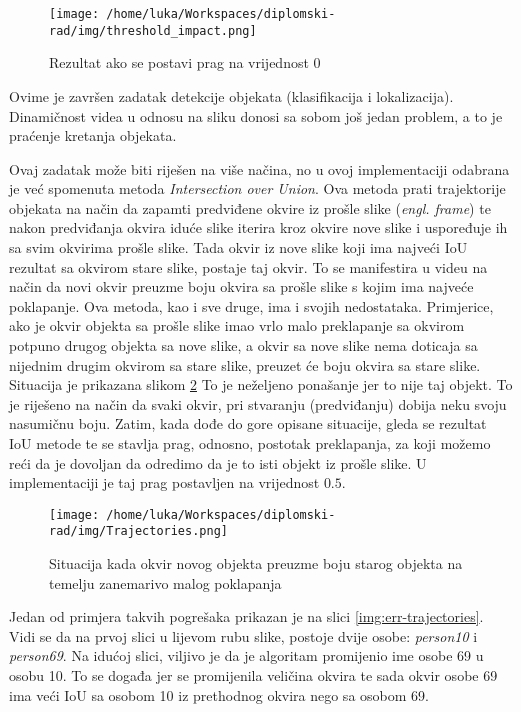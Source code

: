 \begin{figure}[htp]
	\centering
	\texttt{[image: /home/luka/Workspaces/diplomski-rad/img/threshold\_impact.png]}
	\caption{Rezultat ako se postavi prag na vrijednost 0 \citep{YOLO}}
	\label{img:threshold-impact}
\end{figure}

\bigskip
Ovime je završen zadatak detekcije objekata (klasifikacija i lokalizacija). Dinamičnost videa u odnosu na sliku donosi sa sobom još jedan problem, a to je praćenje kretanja objekata. 
\bigskip

Ovaj zadatak može biti riješen na više načina, no u ovoj implementaciji odabrana je već spomenuta metoda \textit{Intersection over Union}. Ova metoda prati trajektorije objekata na način da zapamti predviđene okvire iz prošle slike (\textit{engl. frame}) te nakon predviđanja okvira iduće slike iterira kroz okvire nove slike i uspoređuje ih sa svim okvirima prošle slike. Tada okvir iz nove slike koji ima najveći IoU rezultat sa okvirom stare slike, postaje taj okvir. To se manifestira u videu na način da novi okvir preuzme boju okvira sa prošle slike s kojim ima najveće poklapanje. Ova metoda, kao i sve druge, ima i svojih nedostataka. Primjerice, ako je okvir objekta sa prošle slike imao vrlo malo preklapanje sa okvirom potpuno drugog objekta sa nove slike, a okvir sa nove slike nema doticaja sa nijednim drugim okvirom sa stare slike, preuzet će boju okvira sa stare slike. Situacija je prikazana slikom \ref{img:trajectories1} To je neželjeno ponašanje jer to nije taj objekt. To je riješeno na način da svaki okvir, pri stvaranju (predviđanju) dobija neku svoju nasumičnu boju. Zatim, kada dođe do gore opisane situacije, gleda se rezultat IoU metode te se stavlja prag, odnosno, postotak preklapanja, za koji možemo reći da je dovoljan da odredimo da je to isti objekt iz prošle slike. U implementaciji je taj prag postavljen na vrijednost $0.5$. 

\begin{figure}[htp]
	\centering
	\texttt{[image: /home/luka/Workspaces/diplomski-rad/img/Trajectories.png]}
	\caption{Situacija kada okvir novog objekta preuzme boju starog objekta na temelju zanemarivo malog poklapanja}
	\label{img:trajectories1}
\end{figure}

Jedan od primjera takvih pogrešaka prikazan je na slici \ref{img:err-trajectories}. Vidi se da na prvoj slici u lijevom rubu slike, postoje dvije osobe: \textit{person10} i \textit{person69}. Na idućoj slici, viljivo je da je algoritam promijenio ime osobe 69 u osobu 10. To se događa jer se promijenila veličina okvira te sada okvir osobe 69 ima veći IoU sa osobom 10 iz prethodnog okvira nego sa osobom 69.

